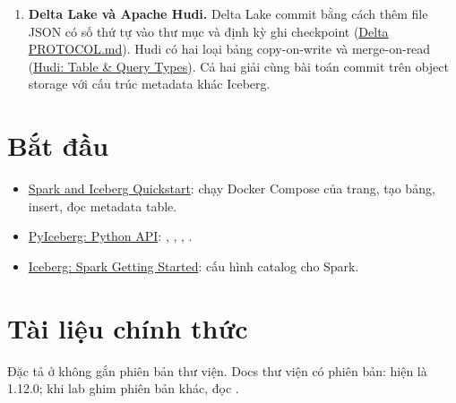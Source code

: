 \begin{enumerate}[resume]
  \item \textbf{Delta Lake và Apache Hudi.} Delta Lake commit bằng cách thêm file JSON có số thứ tự vào thư mục  và định kỳ ghi checkpoint (\href{https://github.com/delta-io/delta/blob/master/PROTOCOL.md}{Delta PROTOCOL.md}). Hudi có hai loại bảng copy-on-write và merge-on-read (\href{https://hudi.apache.org/docs/table_types/}{Hudi: Table \& Query Types}). Cả hai giải cùng bài toán commit trên object storage với cấu trúc metadata khác Iceberg.
\end{enumerate}

\section{Bắt đầu}
\begin{itemize}
  \item \href{https://iceberg.apache.org/spark-quickstart/}{Spark and Iceberg Quickstart}: chạy Docker Compose của trang, tạo bảng, insert, đọc metadata table.
  \item \href{https://py.iceberg.apache.org/api/}{PyIceberg: Python API}: , , , .
  \item \href{https://iceberg.apache.org/docs/latest/spark-getting-started/}{Iceberg: Spark Getting Started}: cấu hình catalog cho Spark.
\end{itemize}

\section{Tài liệu chính thức}
Đặc tả ở  không gắn phiên bản thư viện. Docs thư viện có phiên bản:  hiện là 1.12.0; khi lab ghim phiên bản khác, đọc .

